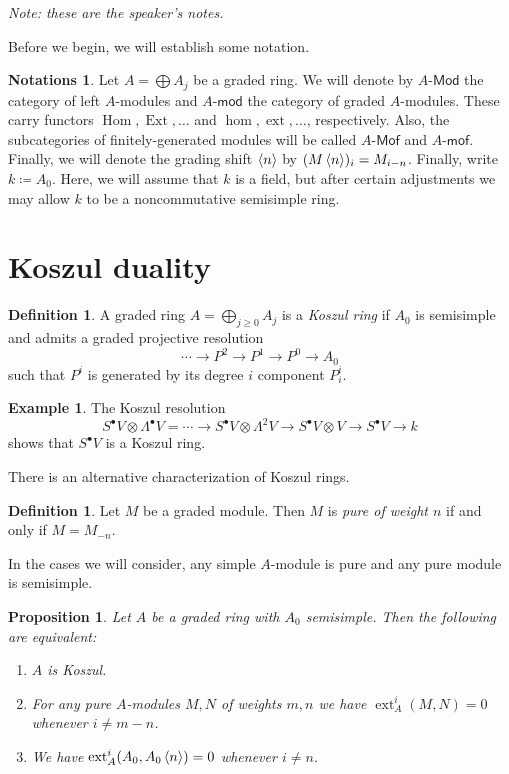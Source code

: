 \documentclass[leqno, openany]{memoir}
\newtheorem{prop}[thm]{Proposition}
\theoremstyle{definition}
\newtheorem{defn}[thm]{Definition}
\newtheorem{exm}[thm]{Example}
\newtheorem{notns}[thm]{Notations}
\theoremstyle{remark}
\theoremstyle{plain}
\theoremstyle{definition}
\theoremstyle{remark}
\newcommand{\ms}[1]{\mathsf{#1}}
\DeclareMathOperator{\Hom}{Hom}
\DeclareMathOperator{\Ext}{Ext}
\DeclareMathOperator{\ext}{ext}
\begin{document}
\textit{Note: these are the speaker's notes.} 

Before we begin, we will establish some notation.
\begin{notns}
    Let $A = \bigoplus A_j$ be a graded ring. We will denote by $A\text{-}\ms{Mod}$ the category of left $A$-modules and $A\text{-}\ms{mod}$ the category of graded $A$-modules. These carry functors $\Hom, \Ext, \ldots$ and $\hom, \ext, \ldots$, respectively. Also, the subcategories of finitely-generated modules will be called $A\text{-}\ms{Mof}$ and $A\text{-}\ms{mof}$. Finally, we will denote the grading shift $\ev{n}$ by $(M\ev{n})_i = M_{i-n}$. Finally, write $k \coloneqq A_0$. Here, we will assume that $k$ is a field, but after certain adjustments we may allow $k$ to be a noncommutative semisimple ring.
\end{notns}

\section{Koszul duality}%
\label{sec:koszul_duality}

\begin{defn}
    A graded ring $A = \bigoplus_{j \geq 0} A_j$ is a \textit{Koszul ring} if $A_0$ is semisimple and admits a graded projective resolution
    \[ \cdots \to P^2 \to P^1 \to P^0 \to A_0 \]
    such that $P^i$ is generated by its degree $i$ component $P^i_i$.
\end{defn}

\begin{exm}
    The Koszul resolution
    \[ S^{\bullet} V \otimes \Lambda^{\bullet} V = \cdots \to S^{\bullet} V \otimes \Lambda^2 V \to S^{\bullet} V \otimes V \to S^{\bullet} V \to k \]
    shows that $S^{\bullet} V$ is a Koszul ring.
\end{exm}

There is an alternative characterization of Koszul rings.
\begin{defn}
    Let $M$ be a graded module. Then $M$ is \textit{pure of weight $n$} if and only if $M = M_{-n}$.
\end{defn}
In the cases we will consider, any simple $A$-module is pure and any pure module is semisimple.
\begin{prop}
    Let $A$ be a graded ring with $A_0$ semisimple. Then the following are equivalent:
    \begin{enumerate}
        \item $A$ is Koszul.
        \item For any pure $A$-modules $M, N$ of weights $m, n$ we have $\ext^i_A(M, N) = 0$ whenever $i \neq m-n$.
        \item We have $\ext_A^i(A_0, A_0\ev{n}) = 0$ whenever $i \neq n$.
    \end{enumerate}
\end{prop}
\end{document}
